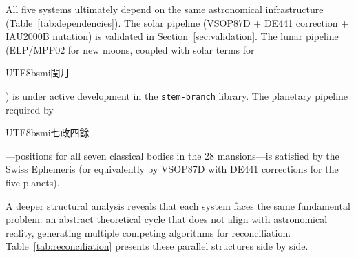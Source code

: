 \documentclass[10pt,a4paper]{article}
\newcommand{\zh}[1]{\begin{CJK}{UTF8}{bsmi}#1\end{CJK}}
\begin{document}
All five systems ultimately depend on the same astronomical infrastructure
(Table~\ref{tab:dependencies}). The solar pipeline (VSOP87D + DE441
correction + IAU2000B nutation) is validated in Section~\ref{sec:validation}.
The lunar pipeline (ELP/MPP02 for new moons, coupled with solar terms for
\zh{閏月}) is under active development in the \texttt{stem-branch} library.
The planetary pipeline required by \zh{七政四餘}---positions for all seven
classical bodies in the 28 mansions---is satisfied by the Swiss Ephemeris
(or equivalently by VSOP87D with DE441 corrections for the five planets).

A deeper structural analysis reveals that each system faces the same
fundamental problem: an abstract theoretical cycle that does not align
with astronomical reality, generating multiple competing algorithms for
reconciliation. Table~\ref{tab:reconciliation} presents these parallel
structures side by side.
\end{document}
